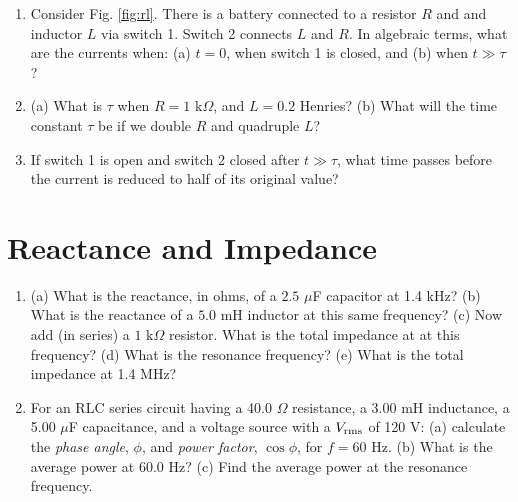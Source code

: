 \documentclass{article}
\begin{document}
\begin{enumerate}
\item Consider Fig. \ref{fig:rl}.  There is a battery connected to a resistor $R$ and and inductor $L$ via switch 1.  Switch 2 connects $L$ and $R$.  In algebraic terms, what are the currents when: (a) $t=0$, when switch 1 is closed, and (b) when $t\gg\tau$? \\ \vspace{2.0cm}
\item (a) What is $\tau$ when $R = 1$ k$\Omega$, and $L = 0.2$ Henries? (b) What will the time constant $\tau$ be if we double $R$ and quadruple $L$? \\ \vspace{0.5cm}
\item If switch 1 is open and switch 2 closed after $t\gg\tau$, what time passes before the current is reduced to half of its original value? \\ \vspace{1cm}
\end{enumerate}

\section{Reactance and Impedance}

\begin{enumerate}
\item (a) What is the reactance, in ohms, of a $2.5$ $\mu$F capacitor at 1.4 kHz? (b) What is the reactance of a $5.0$ mH inductor at this same frequency? (c) Now add (in series) a $1$ k$\Omega$ resistor.  What is the total impedance at at this frequency? (d) What is the resonance frequency? (e) What is the total impedance at 1.4 MHz? \\ \vspace{3.5cm}
\item For an RLC series circuit having a 40.0 $\Omega$ resistance, a 3.00 mH inductance, a 5.00 $\mu$F capacitance, and a voltage source with a $V_{\rm rms}$ of 120 V: (a) calculate the \textit{phase angle}, $\phi$, and \textit{power factor}, $\cos\phi$, for $f = 60$ Hz. (b) What is the average power at 60.0 Hz? (c) Find the average power at the resonance frequency.
\end{enumerate}
\end{document}
